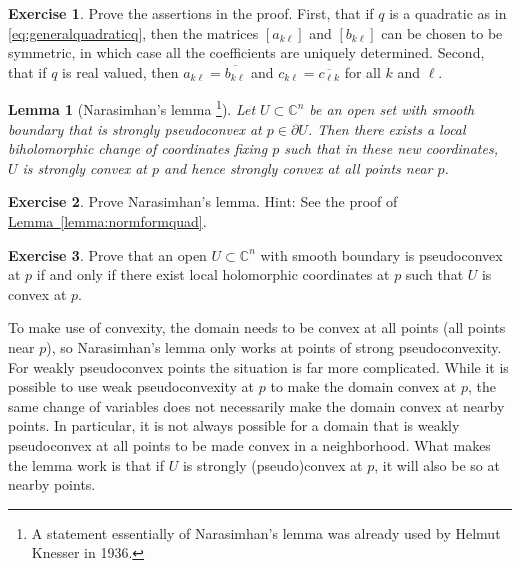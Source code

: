 \documentclass[12pt,openany]{book}
\newcommand{\C}{{\mathbb{C}}}
\theoremstyle{plain}
\newtheorem{lemma}[thm]{Lemma}
\theoremstyle{remark}
\theoremstyle{definition}
\newenvironment{exbox}{%
    \def\FrameCommand{\vrule width 1pt \relax\hspace{10pt}}%
    \MakeFramed{\advance\hsize-\width\FrameRestore}%
}{%
    \endMakeFramed
}
\theoremstyle{exercise}
\newtheorem{exercise}{Exercise}[section]
\theoremstyle{example}
\newcommand{\lemmaref}[1]{\hyperref[#1]{Lemma~\ref*{#1}}}
\begin{document}
\begin{exbox}
\begin{exercise}
Prove the assertions in the proof.  First, that if $q$ is a quadratic as in
\eqref{eq:generalquadraticq}, then the matrices
$[a_{k\ell}]$ and 
$[b_{k\ell}]$ can be chosen to be symmetric, in which case
all the coefficients are uniquely determined.
Second, that if $q$ is real valued, then
 $a_{k\ell} = \overline{b_{k\ell}}$ and $c_{k\ell} = \overline{c_{\ell k}}$
for all $k$ and $\ell$.
\end{exercise}
\end{exbox}

\begin{lemma}[Narasimhan's lemma%
\footnote{A statement essentially of Narasimhan's lemma was already used by Helmut
Knesser in 1936.}]
Let $U \subset \C^n$ be an open set with smooth boundary
that is strongly pseudoconvex at $p \in \partial U$.  Then there exists a local biholomorphic change of
coordinates fixing $p$ such that in these new coordinates, $U$ is strongly
convex at $p$ and hence strongly convex at all points near $p$.
\end{lemma}

\begin{exbox}
\begin{exercise}
Prove Narasimhan's lemma.  Hint: See the proof of \lemmaref{lemma:normformquad}.
\end{exercise}

\begin{exercise}
Prove that an open $U \subset \C^n$ with smooth boundary is pseudoconvex at
$p$ if and only if there exist local holomorphic coordinates at $p$ such that
$U$ is convex at $p$.
\end{exercise}
\end{exbox}

To make use of convexity, the domain needs to be convex at all points
(all points near $p$), so
Narasimhan's lemma only works at points of strong
pseudoconvexity.
For weakly pseudoconvex points the situation is far more complicated.
While it is possible to use
weak pseudoconvexity at $p$ to make the domain convex at $p$, the same
change of variables does not necessarily make the domain convex at nearby
points.  In particular, it is not always possible for a domain that is
weakly pseudoconvex at all points to be made convex in a neighborhood.
What makes the lemma work is that if 
$U$ is strongly (pseudo)convex at $p$, it will also be so
at nearby points.
\end{document}
